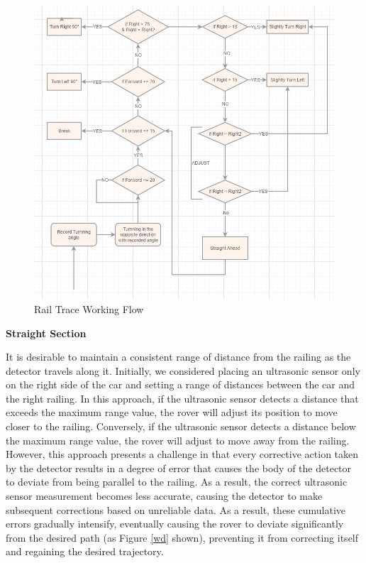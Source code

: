 \documentclass[12pt, a4paper, oneside]{report}
\begin{document}
\begin{figure}[H]
    \centering
    \includegraphics[scale=0.75]{pic/Patio 2/Fig5.png}
    \caption{Rail Trace Working Flow}
    \label{workflow}
\end{figure}

\newpage
\textbf{Straight Section}

It is desirable to maintain a consistent range of distance from the railing as the detector travels along it. Initially, we considered placing an ultrasonic sensor only on the right side of the car and setting a range of distances between the car and the right railing. In this approach, if the ultrasonic sensor detects a distance that exceeds the maximum range value, the rover will adjust its position to move closer to the railing. Conversely, if the ultrasonic sensor detects a distance below the maximum range value, the rover will adjust to move away from the railing. However, this approach presents a challenge in that every corrective action taken by the detector results in a degree of error that causes the body of the detector to deviate from being parallel to the railing. As a result, the correct ultrasonic sensor measurement becomes less accurate, causing the detector to make subsequent corrections based on unreliable data. As a result, these cumulative errors gradually intensify, eventually causing the rover to deviate significantly from the desired path (as Figure \ref{wd} shown), preventing it from correcting itself and regaining the desired trajectory.
\end{document}
